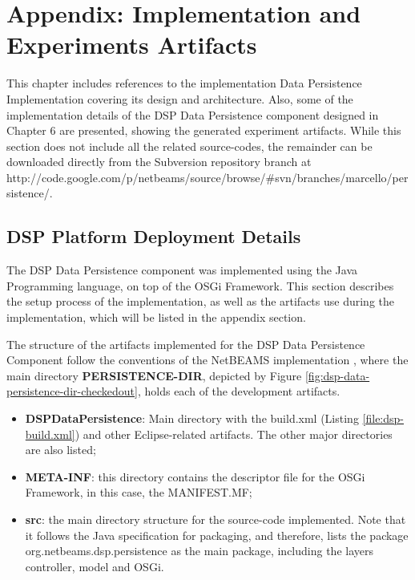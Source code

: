 \chapter{Appendix: Implementation and Experiments Artifacts}

This chapter includes references to the implementation Data Persistence
Implementation covering its design and architecture. Also, some of the
implementation details of the DSP Data Persistence component designed in
Chapter 6 are presented, showing the generated experiment artifacts. While
this section does not include all the related source-codes, the remainder can
be downloaded directly from the Subversion repository branch at
http://code.google.com/p/netbeams/source/browse/\#svn/branches/marcello/persistence/.

\section{DSP Platform Deployment Details}
\label{sec:dsp-data-persistence-implementation}

The DSP Data Persistence component was implemented using the Java Programming
language, on top of the OSGi Framework. This section describes the setup
process of the implementation, as well as the artifacts use during the
implementation, which will be listed in the appendix section.

The structure of the artifacts implemented for the DSP Data Persistence
Component follow the conventions of the NetBEAMS implementation
\cite{netbeams-dsp-architecture}, where the main directory
\textbf{PERSISTENCE-DIR}, depicted by Figure
\ref{fig:dsp-data-persistence-dir-checkedout}, holds each of the development
artifacts.

\begin{itemize}
  \item \textbf{DSPDataPersistence}: Main directory with the build.xml (Listing
  \ref{file:dsp-build.xml}) and other Eclipse-related artifacts. The other
  major directories are also listed;
  \item \textbf{META-INF}: this directory contains the descriptor file for
  the OSGi Framework, in this case, the MANIFEST.MF;
  \item \textbf{src}: the main directory structure for the source-code
  implemented. Note that it follows the Java specification for packaging, and
  therefore, lists the package org.netbeams.dsp.persistence as the main
  package, including the layers controller, model and OSGi.
\end{itemize}

